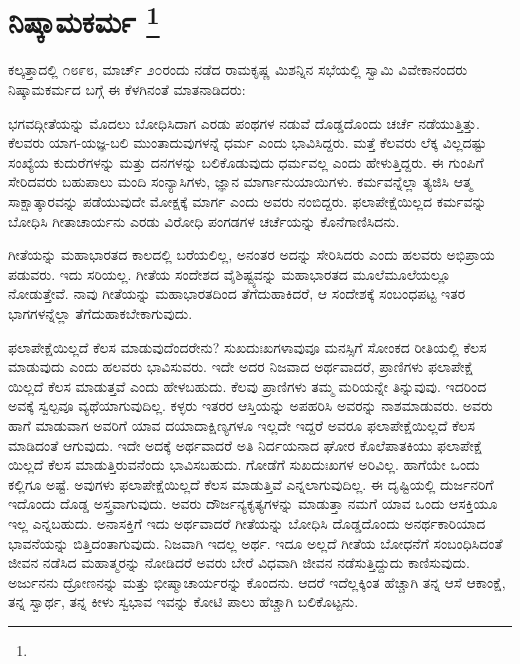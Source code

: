 
\chapter[ನಿಷ್ಕಾಮಕರ್ಮ ]{ನಿಷ್ಕಾಮಕರ್ಮ \protect\footnote{}}

ಕಲ್ಕತ್ತಾದಲ್ಲಿ ೧೮೯೮, ಮಾರ್ಚ್​ ೨೦ರಂದು ನಡೆದ ರಾಮಕೃಷ್ಣ ಮಿಶನ್ನಿನ ಸಭೆಯಲ್ಲಿ ಸ್ವಾಮಿ ವಿವೇಕಾನಂದರು ನಿಷ್ಕಾಮಕರ್ಮದ ಬಗ್ಗೆ ಈ ಕೆಳಗಿನಂತೆ ಮಾತನಾಡಿದರು:

ಭಗವದ್ಗೀತೆಯನ್ನು ಮೊದಲು ಬೋಧಿಸಿದಾಗ ಎರಡು ಪಂಥಗಳ ನಡುವೆ ದೊಡ್ಡದೊಂದು ಚರ್ಚೆ ನಡೆಯುತ್ತಿತ್ತು. ಕೆಲವರು ಯಾಗ-ಯಜ್ಞ-ಬಲಿ ಮುಂತಾದುವುಗಳನ್ನೆ ಧರ್ಮ ಎಂದು ಭಾವಿಸಿದ್ದರು. ಮತ್ತೆ ಕೆಲವರು ಲೆಕ್ಕ ವಿಲ್ಲದಷ್ಟು ಸಂಖ್ಯೆಯ ಕುದುರೆಗಳನ್ನು ಮತ್ತು ದನಗಳನ್ನು ಬಲಿಕೊಡುವುದು ಧರ್ಮವಲ್ಲ ಎಂದು ಹೇಳುತ್ತಿದ್ದರು. ಈ ಗುಂಪಿಗೆ ಸೇರಿದವರು ಬಹುಪಾಲು ಮಂದಿ ಸಂನ್ಯಾಸಿಗಳು, ಜ್ಞಾನ ಮಾರ್ಗಾನುಯಾಯಿಗಳು. ಕರ್ಮವನ್ನೆಲ್ಲಾ ತ್ಯಜಿಸಿ ಆತ್ಮ ಸಾಕ್ಷಾತ್ಕಾರವನ್ನು ಪಡೆಯುವುದೇ ಮೋಕ್ಷಕ್ಕೆ ಮಾರ್ಗ ಎಂದು ಅವರು ನಂಬಿದ್ದರು. ಫಲಾಪೇಕ್ಷೆಯಿಲ್ಲದ ಕರ್ಮವನ್ನು ಬೋಧಿಸಿ ಗೀತಾಚಾರ್ಯನು ಎರಡು ವಿರೋಧಿ ಪಂಗಡಗಳ ಚರ್ಚೆಯನ್ನು ಕೊನೆಗಾಣಿಸಿದನು.

ಗೀತೆಯನ್ನು ಮಹಾಭಾರತದ ಕಾಲದಲ್ಲಿ ಬರೆಯಲಿಲ್ಲ, ಅನಂತರ ಅದನ್ನು ಸೇರಿಸಿದರು ಎಂದು ಹಲವರು ಅಭಿಪ್ರಾಯ ಪಡುವರು. ಇದು ಸರಿಯಲ್ಲ. ಗೀತೆಯ ಸಂದೇಶದ ವೈಶಿಷ್ಟ್ಯವನ್ನು ಮಹಾಭಾರತದ ಮೂಲೆಮೂಲೆಯಲ್ಲೂ ನೋಡುತ್ತೇವೆ. ನಾವು ಗೀತೆಯನ್ನು ಮಹಾಭಾರತದಿಂದ ತೆಗೆದುಹಾಕಿದರೆ, ಆ ಸಂದೇಶಕ್ಕೆ ಸಂಬಂಧಪಟ್ಟ ಇತರ ಭಾಗಗಳನ್ನೆಲ್ಲಾ ತೆಗೆದುಹಾಕಬೇಕಾಗುವುದು.

ಫಲಾಪೇಕ್ಷೆಯಿಲ್ಲದೆ ಕೆಲಸ ಮಾಡುವುದೆಂದರೇನು? ಸುಖದುಃಖಗಳಾವುವೂ ಮನಸ್ಸಿಗೆ ಸೋಂಕದ ರೀತಿಯಲ್ಲಿ ಕೆಲಸ ಮಾಡುವುದು ಎಂದು ಹಲವರು ಭಾವಿಸುವರು. ಇದೇ ಅದರ ನಿಜವಾದ ಅರ್ಥವಾದರೆ, ಪ್ರಾಣಿಗಳು ಫಲಾಪೇಕ್ಷೆ ಯಿಲ್ಲದೆ ಕೆಲಸ ಮಾಡುತ್ತವೆ ಎಂದು ಹೇಳಬಹುದು. ಕೆಲವು ಪ್ರಾಣಿಗಳು ತಮ್ಮ ಮರಿಯನ್ನೇ ತಿನ್ನುವುವು. ಇದರಿಂದ ಅವಕ್ಕೆ ಸ್ವಲ್ಪವೂ ವ್ಯಥೆಯಾಗುವುದಿಲ್ಲ. ಕಳ್ಳರು ಇತರರ ಆಸ್ತಿಯನ್ನು ಅಪಹರಿಸಿ ಅವರನ್ನು ನಾಶಮಾಡುವರು. ಅವರು ಹಾಗೆ ಮಾಡುವಾಗ ಅವರಿಗೆ ಯಾವ ದಯಾದಾಕ್ಷಿಣ್ಯಗಳೂ ಇಲ್ಲದೇ ಇದ್ದರೆ ಅವರೂ ಫಲಾಪೇಕ್ಷೆಯಿಲ್ಲದೆ ಕೆಲಸ ಮಾಡಿದಂತೆ ಆಗುವುದು. ಇದೇ ಅದಕ್ಕೆ ಅರ್ಥವಾದರೆ ಅತಿ ನಿರ್ದಯನಾದ ಘೋರ ಕೊಲೆಪಾತಕಿಯು ಫಲಾಪೇಕ್ಷೆ ಯಿಲ್ಲದೆ ಕೆಲಸ ಮಾಡುತ್ತಿರುವನೆಂದು ಭಾವಿಸಬಹುದು. ಗೋಡೆಗೆ ಸುಖದುಃಖಗಳ ಅರಿವಿಲ್ಲ. ಹಾಗೆಯೇ ಒಂದು ಕಲ್ಲಿಗೂ ಅಷ್ಟೆ. ಅವುಗಳು ಫಲಾಪೇಕ್ಷೆಯಿಲ್ಲದೆ ಕೆಲಸ ಮಾಡುತ್ತಿವೆ ಎನ್ನಲಾಗುವುದಿಲ್ಲ. ಈ ದೃಷ್ಟಿಯಲ್ಲಿ ದುರ್ಜನರಿಗೆ ಇದೊಂದು ದೊಡ್ಡ ಅಸ್ತ್ರವಾಗುವುದು. ಅವರು ದೌರ್ಜನ್ಯಕೃತ್ಯಗಳನ್ನು ಮಾಡುತ್ತಾ ನಮಗೆ ಯಾವ ಒಂದು ಆಸಕ್ತಿಯೂ ಇಲ್ಲ ಎನ್ನಬಹುದು. ಅನಾಸಕ್ತಿಗೆ ಇದು ಅರ್ಥವಾದರೆ ಗೀತೆಯನ್ನು ಬೋಧಿಸಿ ದೊಡ್ಡದೊಂದು ಅನರ್ಥಕಾರಿಯಾದ ಭಾವನೆಯನ್ನು ಬಿತ್ತಿದಂತಾಗುವುದು. ನಿಜವಾಗಿ ಇದಲ್ಲ ಅರ್ಥ. ಇದೂ ಅಲ್ಲದೆ ಗೀತೆಯ ಬೋಧನೆಗೆ ಸಂಬಂಧಿಸಿದಂತೆ ಜೀವನ ನಡೆಸಿದ ಮಹಾತ್ಮರನ್ನು ನೋಡಿದರೆ ಅವರು ಬೇರೆ ವಿಧವಾಗಿ ಜೀವನ ನಡೆಸುತ್ತಿದ್ದುದು ಕಾಣಿಸುವುದು. ಅರ್ಜುನನು ದ್ರೋಣನನ್ನು ಮತ್ತು ಭೀಷ್ಮಾಚಾರ್ಯರನ್ನು ಕೊಂದನು. ಆದರೆ ಇದೆಲ್ಲಕ್ಕಿಂತ ಹೆಚ್ಚಾಗಿ ತನ್ನ ಆಸೆ ಆಕಾಂಕ್ಷೆ, ತನ್ನ ಸ್ವಾರ್ಥ, ತನ್ನ ಕೀಳು ಸ್ವಭಾವ ಇವನ್ನು ಕೋಟಿ ಪಾಲು ಹೆಚ್ಚಾಗಿ ಬಲಿಕೊಟ್ಟನು.

